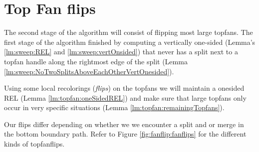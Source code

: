 
\section{Top Fan flips}
\label{s:fanflip}

The second stage of the algorithm will consist of flipping most large topfans. The first stage of the algorithm finished by computing a vertically one-sided \rel (Lemma's \ref{lm:sweep:REL} and \ref{lm:sweep:vertOnsided}) that never has a split next to a topfan handle along the rightmost edge of the split (Lemma \ref{lm:sweep:NoTwoSplitsAboveEachOtherVertOnesided}).

Using some local recolorings (\emph{flips}) on the topfans we will maintain a onesided REL (Lemma \ref{lm:topfan:oneSidedREL}) and make sure that large topfans only occur in very specific situations (Lemma \ref{lm:topfan:remainingTopfans}).

Our flips differ depending on whether we we encounter a split and or merge in the bottom boundary path. Refer to Figure \ref{fig:fanflip:fanflips} for the different kinds of topfanflips.


